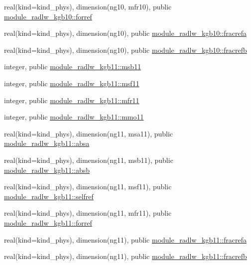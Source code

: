 \begin{DoxyCompactItemize}
\item 
real(kind=kind\+\_\+phys), dimension(ng10, mfr10), public \hyperlink{group__module__radlw__main_gaf70e39048d571053790289549dd8333a}{module\+\_\+radlw\+\_\+kgb10\+::forref}
\item 
real(kind=kind\+\_\+phys), dimension(ng10), public \hyperlink{group__module__radlw__main_gaa8bbfdaf370e12ae26d2ee3c464bdbc2}{module\+\_\+radlw\+\_\+kgb10\+::fracrefa}
\item 
real(kind=kind\+\_\+phys), dimension(ng10), public \hyperlink{group__module__radlw__main_ga07d5bac00d30f1ab873a0542b28d7e83}{module\+\_\+radlw\+\_\+kgb10\+::fracrefb}
\item 
integer, public \hyperlink{group__module__radlw__main_gaa8630868015cb7e358107e6418e35276}{module\+\_\+radlw\+\_\+kgb11\+::msb11}
\item 
integer, public \hyperlink{group__module__radlw__main_ga7dcec9b9f19a3f5f13d443572d834628}{module\+\_\+radlw\+\_\+kgb11\+::msf11}
\item 
integer, public \hyperlink{group__module__radlw__main_ga9b5764441999cce52bc02e65a24420b9}{module\+\_\+radlw\+\_\+kgb11\+::mfr11}
\item 
integer, public \hyperlink{group__module__radlw__main_ga6aabd24aa785ef8689c63b01aaaab243}{module\+\_\+radlw\+\_\+kgb11\+::mmo11}
\item 
real(kind=kind\+\_\+phys), dimension(ng11, msa11), public \hyperlink{group__module__radlw__main_ga7ac883387aa86a635c9aea011c55a1d5}{module\+\_\+radlw\+\_\+kgb11\+::absa}
\item 
real(kind=kind\+\_\+phys), dimension(ng11, msb11), public \hyperlink{group__module__radlw__main_gacf37465675961812e07616e42b137d70}{module\+\_\+radlw\+\_\+kgb11\+::absb}
\item 
real(kind=kind\+\_\+phys), dimension(ng11, msf11), public \hyperlink{group__module__radlw__main_gac98edefcce668d56c3aadc241863741f}{module\+\_\+radlw\+\_\+kgb11\+::selfref}
\item 
real(kind=kind\+\_\+phys), dimension(ng11, mfr11), public \hyperlink{group__module__radlw__main_ga9239d06fcd3fca0f13302c1ae4eb5a60}{module\+\_\+radlw\+\_\+kgb11\+::forref}
\item 
real(kind=kind\+\_\+phys), dimension(ng11), public \hyperlink{group__module__radlw__main_ga5bf6552fb9c1e7c35729b2aea885306e}{module\+\_\+radlw\+\_\+kgb11\+::fracrefa}
\item 
real(kind=kind\+\_\+phys), dimension(ng11), public \hyperlink{group__module__radlw__main_ga0a89a2686ebc70a2c0d8577b89384a56}{module\+\_\+radlw\+\_\+kgb11\+::fracrefb}

\end{DoxyCompactItemize}
